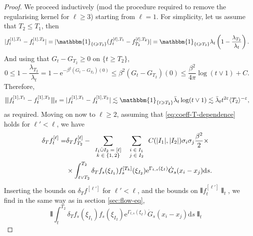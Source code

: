 \documentclass[11pt, a4paper]{scrartcl}
\numberwithin{equation}{section}
\theoremstyle{plain}
\theoremstyle{remark}
\newcommand{\mathd}{\mathrm{d}}
\newcommand{\mathe}{\mathrm{e}}
\newcommand{\tmscript}[1]{\text{\scriptsize{$#1$}}}
\begin{document}
   \begin{proof}
     We proceed inductively (mod the procedure required to remove the
     regularising kernel for $\ell \geqslant 3$) starting from $\ell = 1$. For
     simplicity, let us assume that $T_2 \leqslant T_1$, then
     \[ |f^{[1], T_1}_t - f_t^{[1], T_2}| 
     =|\mathbbm{1}_{\{ t \geqslant T_2 \}}
     (f_t^{[\ell], T_1} - f_{T_2}^{[\ell], T_2})| 
     =\mathbbm{1}_{\{ t \geqslant
        T_2 \}} \lambda_t \left( 1 - \frac{\lambda_{T_2}}{\lambda_t} \right) . \]
     And using that $G_t - G_{T_2} \geqslant 0$ on $\{ t \geqslant T_2 \}$,
     \[ 0 \leqslant 1 - \frac{\lambda_{T_2}}{\lambda_t} = 1 - \mathe^{- \beta^2
        (G_t - G_{T_2}) (0)} \leqslant \beta^2 (G_t - G_{T_2}) (0) \leqslant
        \frac{\beta^2}{4 \pi} \log (t \vee 1) + C. \]
     Therefore,
     \[ \interleave f^{[1], T_1}_t - f_t^{[1], T_2} \interleave_t = | f^{[1],
        T_1}_t - f_t^{[1], T_2} | \lesssim \mathbbm{1}_{\{ t \geqslant T_2 \}}
        \bar{\lambda}_t \log (t \vee 1) \lesssim \bar{\lambda}_t t^{2 \varepsilon} \langle
        T_2 \rangle^{- \varepsilon}, \]
     as required.     
     Moving on now to $\ell \geqslant 2$, assuming that
     \eqref{eq:coeff-T-dependence} holds for $\ell' < \ell$, we have
     \begin{equation*}
      \begin{aligned}
        \delta_T f^{[\ell]}_t =& \delta_T f_{T_2}^{[\ell]} -
        \sum_{\tmscript{\begin{array}{c}
          I_1 \dot{\cup} I_2 = [\ell]\\
          k \in \{ 1, 2 \}
        \end{array}}}  \sum_{\tmscript{\begin{array}{c}
          i \in I_1\\
          j \in I_2
        \end{array}}} C (| I_1 |, | I_2 |)\sigma_i \sigma_j \frac{\beta^2}{2}\times\\ 
        & \times\int_{t \vee T_2}^{T_2}
        \delta_T f_s (\xi_{I_1}) f_s^{[T_k]} (\xi_{I_2}) \mathe^{\Gamma_{t, s}
        (\xi_I)} \dot{G}_s (x_i - x_j) \mathd s. 
      \end{aligned}
     \end{equation*}
     \[ \]
     Inserting the bounds on $\delta_T f^{[\ell']}$ for $\ell' < \ell$, and the
     bounds on $\interleave f_t^{[\ell']} \interleave_t$, we find in the same way
     as in section \ref{sec:flow-eq},
     \[ \interleave \int_t^{T_2} \delta_T f_s (\xi_{I_1}) f_s (\xi_{I_2})
        \mathe^{\Gamma_{t, s} (\xi_I)} \dot{G}_s (x_i - x_j) \mathd s \interleave_t
\]
\end{proof}
\end{document}
